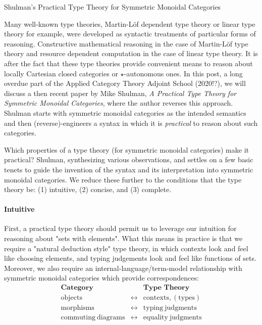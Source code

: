 \documentclass[pra,floatfix,
amsmath,superscriptaddress, 12pt]{article}
\author{Nuiok Dicaire and Paul Lessard}
\date{Elsewhen}
\theoremstyle{definition}
\begin{document}
Shulman's Practical Type Theory for Symmetric Monoidal Categories





Many well-known type theories, Martin-L\"{o}f dependent type theory or linear type theory for example, were developed as syntactic treatments of particular forms of reasoning. Constructive mathematical reasoning in the case of Martin-L\"{o}f type theory and resource dependent computation in the case of linear type theory. It is after the fact that these type theories provide convenient means to reason about locally Cartesian closed categories or $\star$-autonomous ones. In this post, a long overdue part of the Applied Category Theory Adjoint School (2020!?), we will discuss a then recent paper by Mike Shulman, 
\textit{A Practical Type Theory for Symmetric Monoidal Categories}, where the author reverses this approach. 
Shulman starts with symmetric monoidal categories as the intended semantics and then (reverse)-engineers a syntax in which it is \emph{practical} to reason about such categories.

\hrulefill

Which properties of a type theory (for symmetric monoidal categories) make it practical? Shulman, synthesizing various observations, and settles on a few basic tenets to guide the invention of the syntax and its interpretation into symmetric monoidal categories. We reduce these further to the conditions that the type theory be: (1) intuitive, (2) concise, and (3) complete.

\paragraph{Intuitive} First, a practical type theory should permit us to leverage our intuition for reasoning about "sets with elements". What this means in practice is that we require a "natural deduction style" type theory, in which contexts look and feel like choosing elements, and typing judgements look and feel like functions of sets. Moreover, we also require an internal-language/term-model relationship with symmetric monoidal categories which provide correspondences:
\begin{eqnarray*}
\textbf{Category}              &  & \textbf{Type Theory}\\
\mathrm{objects}                & \longleftrightarrow & \mathrm{contexts, (types)}\\
\mathrm{morphisms}              & \longleftrightarrow & \mathrm{typing\ judgments}\\
\mathrm{commuting\ diagrams}     & \longleftrightarrow & \mathrm{equality\ judgments}
\end{eqnarray*}
\end{document}
